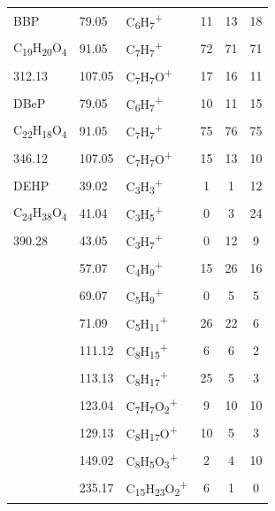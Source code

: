 {\begin{longtable}[c]{lllccc}
\hline
BBP       & 79.05                & C\textsubscript{6}H\textsubscript{7}\textsuperscript{+}                           & 11           & 13           & 18           \\
C\textsubscript{19}H\textsubscript{20}O\textsubscript{4}          & 91.05                & C\textsubscript{7}H\textsubscript{7}\textsuperscript{+}                           & 72           & 71           & 71           \\
312.13          & 107.05               & C\textsubscript{7}H\textsubscript{7}O\textsuperscript{+}                          & 17           & 16           & 11           \\
\hline
DBeP      & 79.05                & C\textsubscript{6}H\textsubscript{7}\textsuperscript{+}                           & 10           & 11           & 15           \\
C\textsubscript{22}H\textsubscript{18}O\textsubscript{4}          & 91.05                & C\textsubscript{7}H\textsubscript{7}\textsuperscript{+}                           & 75           & 76           & 75           \\
346.12          & 107.05               & C\textsubscript{7}H\textsubscript{7}O\textsuperscript{+}                          & 15           & 13           & 10          \\
\hline
DEHP  & 39.02  & C\textsubscript{3}H\textsubscript{3}\textsuperscript{+}                     & 1  & 1  & 12 \\
C\textsubscript{24}H\textsubscript{38}O\textsubscript{4}  & 41.04  & C\textsubscript{3}H\textsubscript{5}\textsuperscript{+}                     & 0  & 3  & 24 \\
390.28  & 43.05  & C\textsubscript{3}H\textsubscript{7}\textsuperscript{+}                     & 0  & 12 & 9  \\
 & 57.07  & C\textsubscript{4}H\textsubscript{9}\textsuperscript{+}                     & 15 & 26 & 16 \\
 & 69.07  & C\textsubscript{5}H\textsubscript{9}\textsuperscript{+}                     & 0  & 5  & 5  \\
 & 71.09  & C\textsubscript{5}H\textsubscript{11}\textsuperscript{+}                    & 26 & 22 & 6  \\
 & 111.12 & C\textsubscript{8}H\textsubscript{15}\textsuperscript{+}                    & 6  & 6  & 2  \\
 & 113.13 & C\textsubscript{8}H\textsubscript{17}\textsuperscript{+}                    & 25 & 5  & 3  \\
 & 123.04 & C\textsubscript{7}H\textsubscript{7}O\textsubscript{2}\textsuperscript{+}   & 9  & 10 & 10 \\
 & 129.13 & C\textsubscript{8}H\textsubscript{17}O\textsuperscript{+}                   & 10 & 5  & 3  \\
 & 149.02 & C\textsubscript{8}H\textsubscript{5}O\textsubscript{3}\textsuperscript{+}   & 2  & 4  & 10 \\
 & 235.17 & C\textsubscript{15}H\textsubscript{23}O\textsubscript{2}\textsuperscript{+} & 6  & 1  & 0  \\
\hline
\end{longtable}  

}
